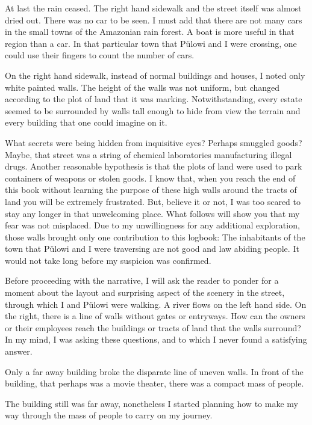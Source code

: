 \documentclass[
  12pt,
]{book}
\begin{document}
At last the rain ceased. The right hand sidewalk and the street itself
was almost dried out. There was no car to be seen. I must add that there
are not many cars in the small towns of the Amazonian rain forest. A
boat is more useful in that region than a car. In that particular town
that Pülowi and I were crossing, one could use their fingers to count
the number of cars.

On the right hand sidewalk, instead of normal buildings and houses, I
noted only white painted walls. The height of the walls was not uniform,
but changed according to the plot of land that it was marking.
Notwithstanding, every estate seemed to be surrounded by walls tall
enough to hide from view the terrain and every building that one could
imagine on it.

What secrets were being hidden from inquisitive eyes? Perhaps smuggled
goods? Maybe, that street was a string of chemical laboratories
manufacturing illegal drugs. Another reasonable hypothesis is that the
plots of land were used to park containers of weapons or stolen goods. I
know that, when you reach the end of this book without learning the
purpose of these high walls around the tracts of land you will be
extremely frustrated. But, believe it or not, I was too scared to stay
any longer in that unwelcoming place. What follows will show you that my
fear was not misplaced. Due to my unwillingness for any additional
exploration, those walls brought only one contribution to this logbook:
The inhabitants of the town that Pülowi and I were traversing are not
good and law abiding people. It would not take long before my suspicion
was confirmed.

Before proceeding with the narrative, I will ask the reader to ponder
for a moment about the layout and surprising aspect of the scenery in
the street, through which I and Pülowi were walking. A river flows on
the left hand side. On the right, there is a line of walls without gates
or entryways. How can the owners or their employees reach the buildings
or tracts of land that the walls surround? In my mind, I was asking
these questions, and to which I never found a satisfying answer.

Only a far away building broke the disparate line of uneven walls. In
front of the building, that perhaps was a movie theater, there was a
compact mass of people.

The building still was far away, nonetheless I started planning how to
make my way through the mass of people to carry on my journey.
\end{document}
